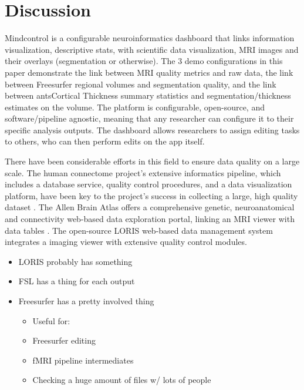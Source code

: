 \section{Discussion}

Mindcontrol is a configurable neuroinformatics dashboard that links information visualization, descriptive stats, with scientific data visualization, MRI images and their overlays (segmentation or otherwise). The 3 demo configurations in this paper demonstrate the link between MRI quality metrics and raw data, the link between Freesurfer regional volumes and segmentation quality, and the link between antsCortical Thickness summary statistics and segmentation/thickness estimates on the volume. The platform is configurable, open-source, and software/pipeline agnostic, meaning that any researcher can configure it to their specific analysis outputs. The dashboard allows researchers to assign editing tasks to others, who can then perform edits on the app itself. 

There have been considerable efforts in this field to ensure data quality on a large scale. The human connectome project's extensive informatics pipeline, which includes a database service, quality control procedures, and a data visualization platform, have been key to the project's success in collecting a large, high quality dataset \cite{Marcus_2013}. The Allen Brain Atlas offers a comprehensive genetic, neuroanatomical and connectivity web-based data exploration portal, linking an MRI viewer with data tables \cite{Sunkin_2012}. The open-source LORIS web-based data management system integrates a imaging viewer with extensive quality control modules\cite{Das_2012}. 

\begin{itemize}
\item LORIS probably has something
\item FSL has a thing for each output
\item Freesurfer has a pretty involved thing
    \begin{itemize}
    \item Useful for:
    \item Freesurfer editing
    \item fMRI pipeline intermediates
    \item Checking a huge amount of files w/ lots of people
    \end{itemize}
\end{itemize}



